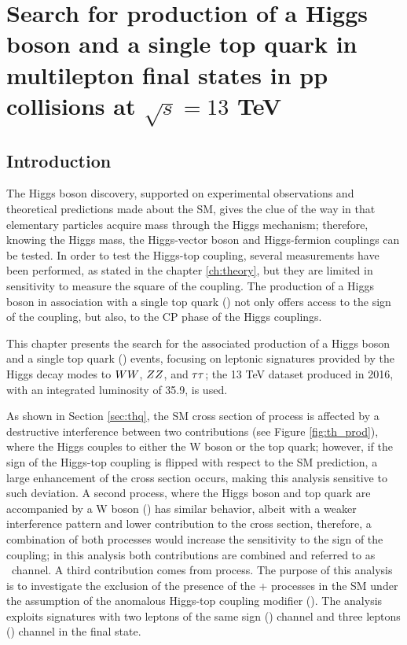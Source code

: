 \setcounter{chapter}{5}
\chapter{Search for production of a Higgs boson and a single top quark in multilepton final states in pp collisions at $\sqrt{s}=13$ TeV}\label{ch:analysis}

\section{Introduction}\label{sec:Intro_analysis}

The Higgs boson discovery, supported on experimental observations and theoretical predictions made about the SM, gives the clue of the way in that elementary particles acquire mass through the Higgs mechanism; therefore, knowing the Higgs mass, the Higgs-vector boson and Higgs-fermion couplings can be tested. In order to test the Higgs-top coupling, several measurements have been performed, as stated in the chapter \ref{ch:theory}, but they are limited in sensitivity to measure the square of the coupling. The production of a Higgs boson in association with a single top quark (\tH) not only offers access to the sign of the coupling, but also, to the CP phase of the Higgs couplings.

This chapter presents the search for the associated production of a Higgs boson and a single top quark (\tHq) events, focusing on leptonic signatures provided by the Higgs decay modes to $WW$, $ZZ$, and $\tau\tau$; the 13 TeV dataset produced in 2016, with an integrated luminosity of 35.9\fbinv, is used.

As shown in Section \ref{sec:thq}, the SM cross section of \tHq process is affected by a destructive interference between two contributions (see Figure \ref{fig:th_prod}), where the Higgs couples to either the W boson or the top quark; however, if the sign of the Higgs-top coupling is flipped with respect to the SM prediction, a large enhancement of the cross section occurs, making this analysis sensitive to such deviation. A second process, where the Higgs boson and top quark are accompanied by a W boson (\tHW) has similar behavior, albeit with a weaker interference pattern and lower contribution to the cross section, therefore, a combination of both processes would increase the sensitivity to the sign of the coupling; in this analysis both contributions are combined and referred to as \tH\ channel. A third contribution comes from \ttH process. The purpose of this analysis is to investigate the exclusion of the presence of the \tH + \ttH processes in the SM under the assumption of the anomalous Higgs-top coupling modifier (). The analysis exploits signatures with two leptons of the same sign () channel and three leptons () channel in the final state.

